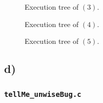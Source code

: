 \documentclass[a4paper,11pt]{report}
\begin{document}
\begin{figure}[ht]
  \centering
  \caption{\label{fig:ex4-3}Execution tree of $(3)$.}
\end{figure}

\begin{figure}[ht]
  \centering
  \caption{\label{fig:ex4-4}Execution tree of $(4)$.}
\end{figure}

\begin{figure}[ht]
  \centering
  \caption{\label{fig:ex4-5}Execution tree of $(5)$.}
\end{figure}

\subsection*{d)}

\subsubsection{\texttt{tellMe\_unwiseBug.c}}
\end{document}
